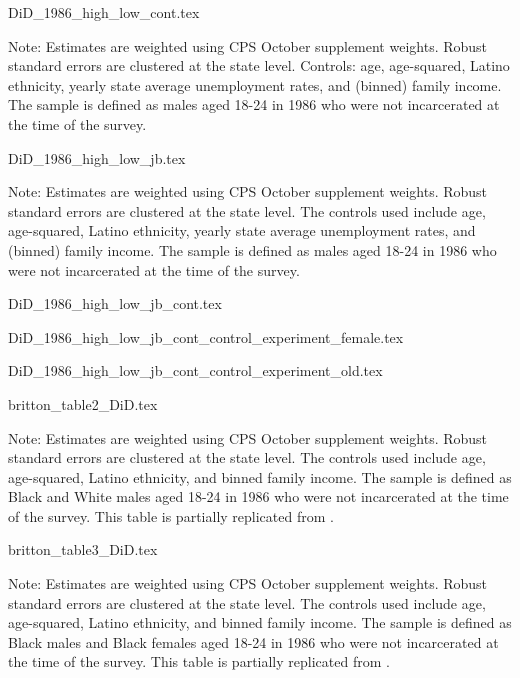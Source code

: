 {DiD_1986_high_low_cont.tex}
\begin{footnotesize}
  \noindent Note: Estimates are weighted using CPS October supplement weights. Robust standard errors are clustered at the state level. Controls: age, age-squared, Latino ethnicity, yearly state average unemployment rates, and (binned) family income. The sample is defined as males aged 18-24 in 1986 who were not incarcerated at the time of the survey.
\end{footnotesize}
\clearpage

{DiD_1986_high_low_jb.tex}
\begin{footnotesize}
  \noindent Note: Estimates are weighted using CPS October supplement weights. Robust standard errors are clustered at the state level. The controls used include age, age-squared, Latino ethnicity, yearly state average unemployment rates, and (binned) family income. The sample is defined as males aged 18-24 in 1986 who were not incarcerated at the time of the survey.
\end{footnotesize}

{DiD_1986_high_low_jb_cont.tex}
\clearpage

{DiD_1986_high_low_jb_cont_control_experiment_female.tex}


{DiD_1986_high_low_jb_cont_control_experiment_old.tex}

\clearpage



{britton_table2_DiD.tex}
\begin{footnotesize}
  \noindent Note: Estimates are weighted using CPS October supplement weights. Robust standard errors are clustered at the state level. The controls used include age, age-squared, Latino ethnicity, and binned family income. The sample is defined as Black and White males aged 18-24 in 1986 who were not incarcerated at the time of the survey.
  This table is partially replicated from \cite{britton2022}.
\end{footnotesize}

{britton_table3_DiD.tex}
\begin{footnotesize}
  \noindent Note: Estimates are weighted using CPS October supplement weights. Robust standard errors are clustered at the state level. The controls used include age, age-squared, Latino ethnicity, and binned family income. The sample is defined as Black males and Black females aged 18-24 in 1986 who were not incarcerated at the time of the survey. This table is partially replicated from \cite{britton2022}.
\end{footnotesize}

